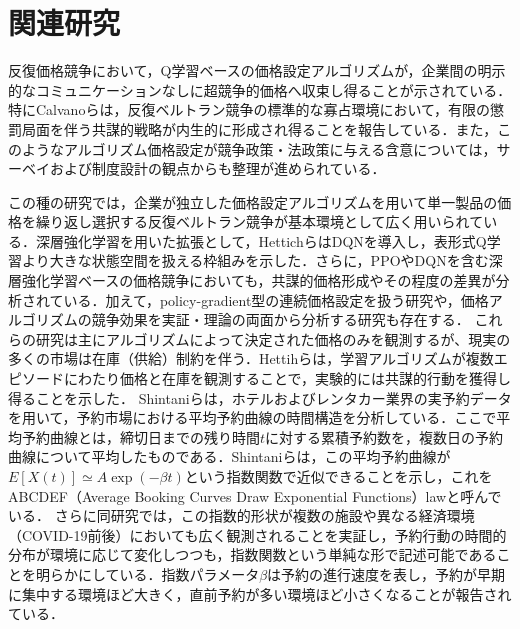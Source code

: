 \documentclass[runningheads]{llncs}
\begin{document}


\section{関連研究}

反復価格競争において，Q学習ベースの価格設定アルゴリズムが，企業間の明示的なコミュニケーションなしに超競争的価格へ収束し得ることが示されている\cite{calvano2020a,klein2021}．特にCalvanoら\cite{calvano2020a}は，反復ベルトラン競争の標準的な寡占環境において，有限の懲罰局面を伴う共謀的戦略が内生的に形成され得ることを報告している．また，このようなアルゴリズム価格設定が競争政策・法政策に与える含意については，サーベイおよび制度設計の観点からも整理が進められている\cite{calvano2020b,harrington2019}．

この種の研究では，企業が独立した価格設定アルゴリズムを用いて単一製品の価格を繰り返し選択する反復ベルトラン競争が基本環境として広く用いられている\cite{calvano2020a,klein2021}．深層強化学習を用いた拡張として，Hettichら\cite{hettich2021}はDQN\cite{mnih2015}を導入し，表形式Q学習より大きな状態空間を扱える枠組みを示した．さらに，PPOやDQNを含む深層強化学習ベースの価格競争においても，共謀的価格形成やその程度の差異が分析されている\cite{Schlechtinger2024,deng2024algorithmic}．加えて，policy-gradient型の連続価格設定を扱う研究\cite{martello2022autonomous}や，価格アルゴリズムの競争効果を実証・理論の両面から分析する研究\cite{brown2021,assad2020,Abada2020,Sanchez-Cartas2022}も存在する．
これらの研究は主にアルゴリズムによって決定された価格のみを観測するが、現実の多くの市場は在庫（供給）制約を伴う．Hettihら\cite{friedrich2025learning}は，学習アルゴリズムが複数エピソードにわたり価格と在庫を観測することで，実験的には共謀的行動を獲得し得ることを示した．
Shintaniら\cite{ShintaniUmeno2023ABCDEF}は，ホテルおよびレンタカー業界の実予約データを用いて，予約市場における平均予約曲線の時間構造を分析している．ここで平均予約曲線とは，締切日までの残り時間$t$に対する累積予約数を，複数日の予約曲線について平均したものである．Shintaniらは，この平均予約曲線が$E[X(t)] \simeq A\exp(-\beta t)$という指数関数で近似できることを示し，これをABCDEF（Average Booking Curves Draw Exponential Functions）lawと呼んでいる．
さらに同研究では，この指数的形状が複数の施設や異なる経済環境（COVID-19前後）においても広く観測されることを実証し，予約行動の時間的分布が環境に応じて変化しつつも，指数関数という単純な形で記述可能であることを明らかにしている．指数パラメータ$\beta$は予約の進行速度を表し，予約が早期に集中する環境ほど大きく，直前予約が多い環境ほど小さくなることが報告されている．
\end{document}
